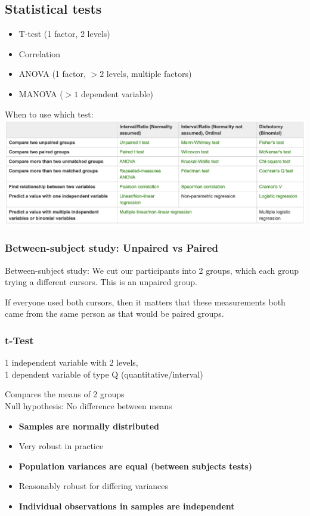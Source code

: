 \subsection{Statistical tests}
\begin{itemize}
    \item T-test (1 factor, 2 levels)
    \item Correlation
\item ANOVA (1 factor, $>2$ levels, multiple factors)
\item MANOVA ($>1$ dependent variable)
\end{itemize}
When to use which test:\\
\includegraphics[scale=.25]{lectures/wk10/tests.png}

\subsubsection{Between-subject study: Unpaired vs Paired}
Between-subject study: We cut our participants into 2 groups, which each group trying a different cursors. This is an unpaired group.

If everyone used both cursors, then it matters that these measurements both came from the same person as that would be paired groups.

\subsubsection{t-Test}
1 independent variable with 2 levels,\\
1 dependent variable of type Q (quantitative/interval)

Compares the means of 2 groups\\
Null hypothesis: No difference between means

\begin{itemize}
    \item \textbf{Samples are normally distributed}
    \item Very robust in practice
    \item \textbf{Population variances are equal (between subjects tests)}
    \item Reasonably robust for differing variances
    \item \textbf{Individual observations in samples are independent}
\end{itemize}

